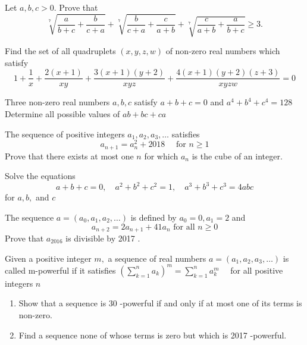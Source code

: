 \documentclass{pset}
\begin{document}
\begin{problems}

\begin{problem}[IrMO 2020 Q5]
    Let $a, b, c>0 .$ Prove that
$$
\sqrt[7]{\frac{a}{b+c}+\frac{b}{c+a}}+\sqrt[7]{\frac{b}{c+a}+\frac{c}{a+b}}+\sqrt[7]{\frac{c}{a+b}+\frac{a}{b+c}} \geq 3.
$$
\end{problem}

\begin{problem}[IrMO 2019 Q4]
    Find the set of all quadruplets \((x, y, z, w)\) of non-zero real numbers which satisfy
    $$
    1+\frac{1}{x}+\frac{2(x+1)}{x y}+\frac{3(x+1)(y+2)}{x y z}+\frac{4(x+1)(y+2)(z+3)}{x y z w}=0
    $$
\end{problem}

\begin{problem}[IrMO 2019 Q7]
    Three non-zero real numbers \(a, b, c\) satisfy \(a+b+c=0\) and \(a^{4}+b^{4}+c^{4}=128\) Determine all possible values of \(a b+b c+c a\)
\end{problem}


\begin{problem}[IrMO 2018 Q9]
    The sequence of positive integers \(a_{1}, a_{2}, a_{3}, \ldots\) satisfies
    $$
    a_{n+1}=a_{n}^{2}+2018 \quad \text { for } n \geq 1
    $$
    Prove that there exists at most one \(n\) for which \(a_{n}\) is the cube of an integer.
\end{problem}


\begin{problem}[IrMO 2017 Q2]
    Solve the equations
    $$
    a+b+c=0, \quad a^{2}+b^{2}+c^{2}=1, \quad a^{3}+b^{3}+c^{3}=4 a b c
    $$
    for \(a, b,\) and \(c\)
\end{problem}

\begin{problem}[IrMO 2017 Q5]
    The sequence \(a=\left(a_{0}, a_{1}, a_{2}, \ldots\right)\) is defined by \(a_{0}=0, a_{1}=2\) and
    $$
    a_{n+2}=2 a_{n+1}+41 a_{n} \text { for all } n \geq 0
    $$
    Prove that \(a_{2016}\) is divisible by 2017 .
\end{problem}

\begin{problem}[IrMO 2017 Q10]
    Given a positive integer \(m,\) a sequence of real numbers \(a=\left(a_{1}, a_{2}, a_{3}, \ldots\right)\) is called m-powerful if it satisfies \(\left(\sum_{k=1}^{n} a_{k}\right)^{m}=\sum_{k=1}^{n} a_{k}^{m} \quad\) for all positive integers \(n\)
    \begin{enumerate}
        \item Show that a sequence is 30 -powerful if and only if at most one of its terms is non-zero.
        \item Find a sequence none of whose terms is zero but which is 2017 -powerful.
    \end{enumerate}
\end{problem}


\end{problems}
\end{document}
